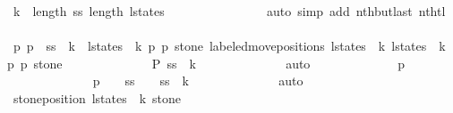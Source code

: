 \begin{isabellebody}
\ {\isacharbackquoteopen}k\ {\isacharless}\ length\ {\isacharquery}ss{\isacharbackquoteclose}\ {\isacharbackquoteopen}length\ l{\isacharunderscore}states\ {\isasymge}\ {}{\isacharbackquoteclose}\isanewline
\ \ \ \ \ \ \ \ \ \ \ \ \isamarkupfalse%
\ {\isacharparenleft}auto\ simp\ add{\isacharcolon}\ nth{\isacharunderscore}butlast\ nth{\isacharunderscore}tl{\isacharparenright}\isanewline
\ \ \ \ \ \ \ \ \ \ \isamarkupfalse%
\ \isamarkupfalse%
\ p{}{\isacharprime}\ p{}{\isacharprime}\ \ {\isachardoublequoteopen}{\isacharquery}ss\ {\isacharbang}\ k\ {\isacharequal}\ {\isacharparenleft}l{\isacharunderscore}states\ {\isacharbang}\ k{\isacharcomma}\ p{}{\isacharprime}{\isacharcomma}\ p{}{\isacharprime}{\isacharcomma}\ stone{\isacharparenright}{\isachardoublequoteclose}\ {\isachardoublequoteopen}labeled{\isacharunderscore}move{\isacharunderscore}positions\ {\isacharparenleft}l{\isacharunderscore}states\ {\isacharbang}\ k{\isacharparenright}\ {\isacharparenleft}l{\isacharunderscore}states\ {\isacharbang}\ {\isacharparenleft}k{\isacharplus}{}{\isacharparenright}{\isacharparenright}\ {\isacharequal}\ {\isacharparenleft}p{}{\isacharprime}{\isacharcomma}\ p{}{\isacharprime}{\isacharcomma}\ stone{\isacharparenright}{\isachardoublequoteclose}\isanewline
\ \ \ \ \ \ \ \ \ \ \ \ \isamarkupfalse%
\ {\isacharbackquoteopen}{\isacharquery}P\ {\isacharparenleft}{\isacharquery}ss\ {\isacharbang}\ k{\isacharparenright}{\isacharbackquoteclose}\isanewline
\ \ \ \ \ \ \ \ \ \ \ \ \isamarkupfalse%
\ auto\isanewline
\ \ \ \ \ \ \ \ \ \ \isamarkupfalse%
\ \isamarkupfalse%
\ {\isachardoublequoteopen}p{}{\isacharprime}\ {\isasymnoteq}\ {}{\isachardoublequoteclose}\isanewline
\ \ \ \ \ \ \ \ \ \ \ \ \isamarkupfalse%
\ {\isacharbackquoteopen}{\isacharquery}p{}\ {}\ {\isasymnoteq}\ {}{\isacharbackquoteclose}\ {\isacharbackquoteopen}ss\ {\isacharbang}\ {}\ {\isacharequal}\ {\isacharquery}ss\ {\isacharbang}\ k{\isacharbackquoteclose}\isanewline
\ \ \ \ \ \ \ \ \ \ \ \ \isamarkupfalse%
\ auto\isanewline
\ \ \ \ \ \ \ \ \ \ \isamarkupfalse%
\ {\isachardoublequoteopen}stone{\isacharunderscore}position\ {\isacharparenleft}l{\isacharunderscore}states\ {\isacharbang}\ k{\isacharparenright}\ stone\ {\isasymnoteq}\ {}{\isachardoublequoteclose}\isanewline

\end{isabellebody}
